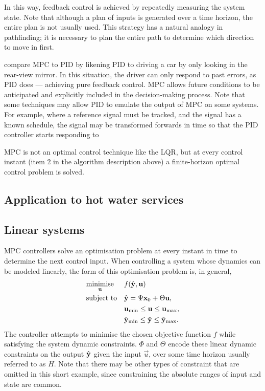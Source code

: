 In this way, feedback control is achieved by repeatedly measuring the system state.
Note that although a plan of inputs is generated over a time horizon, the entire plan is not usually used.
This strategy has a natural analogy in pathfinding; it is necessary to plan the entire path to determine which direction to move in first.

 compare MPC to PID by likening PID to driving a car by only looking in the rear-view mirror.
In this situation, the driver can only respond to past errors, as PID does --- achieving pure feedback control.
MPC allows future conditions to be anticipated and explicitly included in the decision-making process.
Note that some techniques may allow PID to emulate the output of MPC on some systems.
For example, where a reference signal must be tracked, and the signal has a known schedule, the signal may be transformed forwards in time so that the PID controller starts responding to 

MPC is not an optimal control technique like the LQR, but at every control instant (item 2 in the algorithm description above) a finite-horizon optimal control problem is solved.

\subsection{Application to hot water services}



\subsection{Linear systems}

MPC controllers solve an optimisation problem at every instant in time to determine the next control input.
When controlling a system whose dynamics can be modeled linearly, the form of this optimisation problem is, in general,
\begin{equation}
   \label{eq:mpc-opt}
   \begin{aligned}
      & \underset{\mathbf{u}}{\text{minimise}}
      & & f(\hat{\mathbf{y}}, \mathbf{u}) \\
      & \text{subject to}
      & & \hat{\mathbf{y}} = \Psi \mathbf{x}_0 + \Theta \mathbf{u}, \\
      &&& \mathbf{u}_{\text{min}} \le \mathbf{u} \le \mathbf{u}_{\text{max}}, \\
      &&& \hat{\mathbf{y}}_{\text{min}} \le \hat{\mathbf{y}} \le \hat{\mathbf{y}}_{\text{max}}.
   \end{aligned}
\end{equation}
The controller attempts to minimise the chosen objective function $f$ while satisfying the system dynamic constraints.
$\Phi$ and $\Theta$ encode these linear dynamic constraints on the output $\hat{\mathbf{y}}$ given the input $\vec{u}$, over some time horizon usually referred to as $H$.
Note that there may be other types of constraint that are omitted in this short example, since constraining the absolute ranges of input and state are common.

